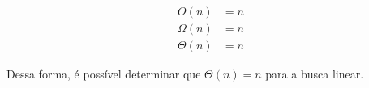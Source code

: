 \begin{align*}
    O(n) &= n \\
    \Omega(n) &= n \\
    \Theta(n) &= n
\end{align*}

Dessa forma, é possível determinar que $\Theta(n) = n$ para a busca linear.


